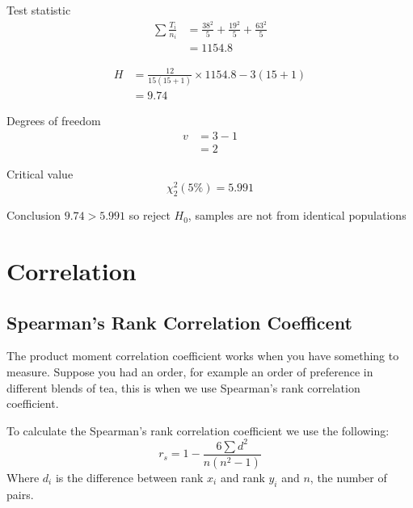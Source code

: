 \begin{example}
\begin{step}{Test statistic}
        \begin{align*}
        \sum\frac{T_i}{n_i} &= \frac{38^2}{5} + \frac{19^2}{5} + \frac{63^2}{5}\\
        &= 1154.8
        \end{align*}

        \begin{align*}
        H &= \frac{12}{15(15 + 1)} \times 1154.8 - 3(15 + 1)\\
        &= 9.74
        \end{align*}
        \end{step}

        \begin{step}{Degrees of freedom}
        \begin{align*}
        v &= 3 - 1 \\
          &= 2
        \end{align*}
        \end{step}

        \begin{step}{Critical value}
        $$
        \chi^2_2(5\%) = 5.991
        $$
        \end{step}
        
        \begin{step}{Conclusion}
        $9.74 > 5.991$ so reject $H_0$, samples are not from identical populations
        \end{step}
        \end{example}
\section{Correlation}
    \subsection{Spearman's Rank Correlation Coefficent}

        The product moment correlation coefficient works when you have something to measure. Suppose you had an order, for example an order of preference in different blends of tea, this is when we use Spearman's rank correlation coefficient.

        To calculate the Spearman's rank correlation coefficient we use the following:
        $$
        r_s = 1 - \frac{6\sum{d^2}}{n(n^2-1)}
        $$
        Where $d_i$ is the difference between rank $x_i$ and rank $y_i$ and $n$, the number of pairs.

